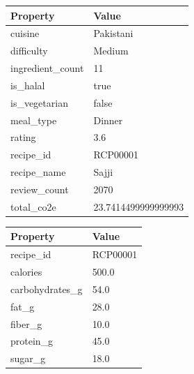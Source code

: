 \documentclass{article}
\begin{document}
\begin{figure}[H]
\begin{minipage}{0.48\textwidth}
\centering
\begin{tabular}{ll}
\hline
\textbf{Property} & \textbf{Value} \\
\hline
cuisine & Pakistani \\
difficulty & Medium \\
ingredient\_count & 11 \\
is\_halal & true \\
is\_vegetarian & false \\
meal\_type & Dinner \\
rating & 3.6 \\
recipe\_id & RCP00001 \\
recipe\_name & Sajji \\
review\_count & 2070 \\
total\_co2e & 23.7414499999999993 \\
\hline
\end{tabular}
\end{minipage}
\hfill
\begin{minipage}{0.48\textwidth}
\centering
\begin{tabular}{ll}
\hline
\textbf{Property} & \textbf{Value} \\
\hline
recipe\_id & RCP00001 \\
calories & 500.0 \\
carbohydrates\_g & 54.0 \\
fat\_g & 28.0 \\
fiber\_g & 10.0 \\
protein\_g & 45.0 \\
sugar\_g & 18.0 \\
\hline
\end{tabular}
\end{minipage}
\end{figure}
\end{document}
